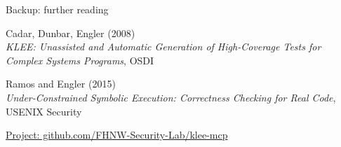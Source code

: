 \documentclass[aspectratio=169,11pt]{beamer}
\begin{document}
\begin{frame}{Backup: further reading}
  \begin{points}
    \item Cadar, Dunbar, Engler (2008)\\\textit{KLEE: Unassisted and Automatic Generation of High-Coverage Tests for Complex Systems Programs}, OSDI
    \item Ramos and Engler (2015)\\\textit{Under-Constrained Symbolic Execution: Correctness Checking for Real Code}, USENIX Security
  \end{points}
  \vspace{2mm}
  \href{https://github.com/FHNW-Security-Lab/klee-mcp}{\footnotesize Project: github.com/FHNW-Security-Lab/klee-mcp}
\end{frame}
\end{document}
